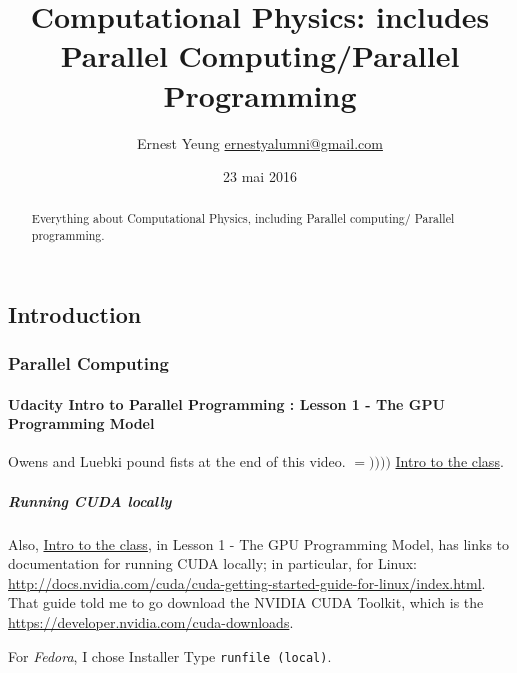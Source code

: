 \documentclass[10pt]{amsart}
\title{Computational Physics: includes Parallel Computing/Parallel Programming}
\author{Ernest Yeung \href{mailto:ernestyalumni@gmail.com}{ernestyalumni@gmail.com}}
\date{23 mai 2016}
\begin{document}

\maketitle

\tableofcontents


\begin{multicols*}{2}

\begin{abstract}
Everything about Computational Physics, including Parallel computing/ Parallel programming.  
\end{abstract}

\part{Introduction}

\section{Parallel Computing}

\subsection{Udacity Intro to Parallel Programming : Lesson 1 - The GPU Programming Model}

Owens and Luebki pound fists at the end of this video.  $=))))$  \href{https://classroom.udacity.com/courses/cs344/lessons/55120467/concepts/658304810923}{Intro to the class}.

\subsubsection{Running CUDA locally}
Also, \href{https://classroom.udacity.com/courses/cs344/lessons/55120467/concepts/658304810923}{Intro to the class}, in Lesson 1 - The GPU Programming Model, has links to documentation for running CUDA locally; in particular, for Linux: \url{http://docs.nvidia.com/cuda/cuda-getting-started-guide-for-linux/index.html}.  That guide told me to go download the NVIDIA CUDA Toolkit, which is the \href{NVIDIA CUDA Developer Toolkit}{https://developer.nvidia.com/cuda-downloads}.  

For \emph{Fedora}, I chose Installer Type \verb|runfile (local)|.  


\end{multicols*}
\end{document}
